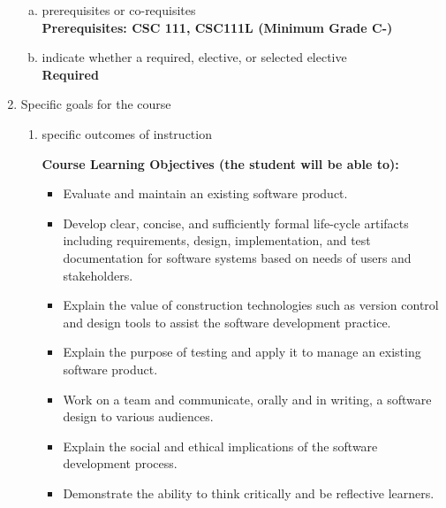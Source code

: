 \begin{enumerate}[1.]
\begin{enumerate}[a.]
\item prerequisites or co-requisites\\
  {\bfseries
    Prerequisites: CSC 111, CSC111L (Minimum Grade C-) \\  %
  }

\item indicate whether a required, elective, or selected elective\\ %
  {\bfseries
    Required
  }

\end{enumerate}

\item Specific goals for the course
\begin{enumerate}
\item specific outcomes of instruction\\ %
  {\bfseries
    Course Learning Objectives (the student will be able to):
    \begin{itemize}
      \item Evaluate and maintain an existing software product.
      \item Develop clear, concise, and sufficiently formal life-cycle artifacts including requirements, design, implementation, and test documentation for software systems based on needs of users and stakeholders.
      \item Explain the value of construction technologies such as version control and design tools to assist the software development practice.
      \item Explain the purpose of testing and apply it to manage an existing software product.
      \item Work on a team and communicate, orally and in writing, a software design to various audiences.
      \item Explain the social and ethical implications of the software development process.
      \item Demonstrate the ability to think critically and be reflective learners.
    \end{itemize}
  }


\end{enumerate}
\end{enumerate}
